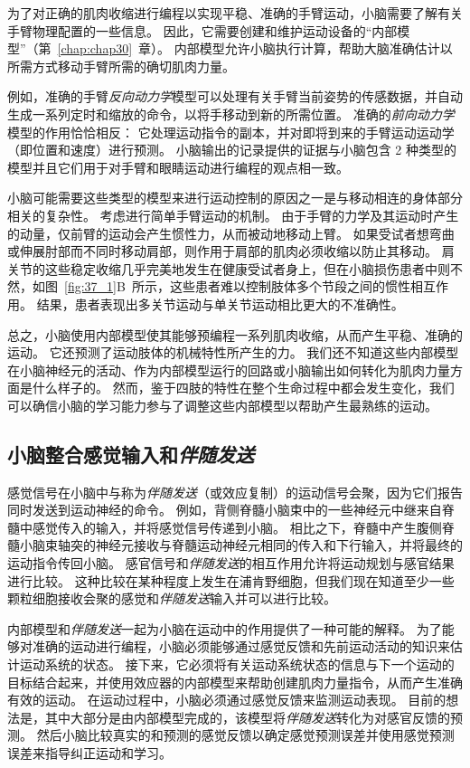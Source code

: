 为了对正确的肌肉收缩进行编程以实现平稳、准确的手臂运动，小脑需要了解有关手臂物理配置的一些信息。
因此，它需要创建和维护运动设备的“内部模型”（第~\ref{chap:chap30}~章）。
内部模型允许小脑执行计算，帮助大脑准确估计以所需方式移动手臂所需的确切肌肉力量。


例如，准确的手臂\textit{反向动力学}模型可以处理有关手臂当前姿势的传感数据，并自动生成一系列定时和缩放的命令，以将手移动到新的所需位置。
准确的\textit{前向动力学}模型的作用恰恰相反：
它处理运动指令的副本，并对即将到来的手臂运动运动学（即位置和速度）进行预测。
小脑输出的记录提供的证据与小脑包含 2 种类型的模型并且它们用于对手臂和眼睛运动进行编程的观点相一致。


小脑可能需要这些类型的模型来进行运动控制的原因之一是与移动相连的身体部分相关的复杂性。
考虑进行简单手臂运动的机制。
由于手臂的力学及其运动时产生的动量，仅前臂的运动会产生惯性力，从而被动地移动上臂。
如果受试者想弯曲或伸展肘部而不同时移动肩部，则作用于肩部的肌肉必须收缩以防止其移动。
肩关节的这些稳定收缩几乎完美地发生在健康受试者身上，但在小脑损伤患者中则不然，如图~\ref{fig:37_1}B~所示，这些患者难以控制肢体多个节段之间的惯性相互作用。
结果，患者表现出多关节运动与单关节运动相比更大的不准确性。


总之，小脑使用内部模型使其能够预编程一系列肌肉收缩，从而产生平稳、准确的运动。
它还预测了运动肢体的机械特性所产生的力。 我们还不知道这些内部模型在小脑神经元的活动、作为内部模型运行的回路或小脑输出如何转化为肌肉力量方面是什么样子的。
然而，鉴于四肢的特性在整个生命过程中都会发生变化，我们可以确信小脑的学习能力参与了调整这些内部模型以帮助产生最熟练的运动。



\subsection{小脑整合感觉输入和\textit{伴随发送}}

感觉信号在小脑中与称为\textit{伴随发送}（或效应复制）的运动信号会聚，因为它们报告同时发送到运动神经的命令。
例如，背侧脊髓小脑束中的一些神经元中继来自脊髓中感觉传入的输入，并将感觉信号传递到小脑。
相比之下，脊髓中产生腹侧脊髓小脑束轴突的神经元接收与脊髓运动神经元相同的传入和下行输入，并将最终的运动指令传回小脑。
感官信号和\textit{伴随发送}的相互作用允许将运动规划与感官结果进行比较。
这种比较在某种程度上发生在浦肯野细胞，但我们现在知道至少一些颗粒细胞接收会聚的感觉和\textit{伴随发送}输入并可以进行比较。


内部模型和\textit{伴随发送}一起为小脑在运动中的作用提供了一种可能的解释。
为了能够对准确的运动进行编程，小脑必须能够通过感觉反馈和先前运动活动的知识来估计运动系统的状态。
接下来，它必须将有关运动系统状态的信息与下一个运动的目标结合起来，并使用效应器的内部模型来帮助创建肌肉力量指令，从而产生准确有效的运动。
在运动过程中，小脑必须通过感觉反馈来监测运动表现。
目前的想法是，其中大部分是由内部模型完成的，该模型将\textit{伴随发送}转化为对感官反馈的预测。
然后小脑比较真实的和预测的感觉反馈以确定感觉预测误差并使用感觉预测误差来指导纠正运动和学习。


